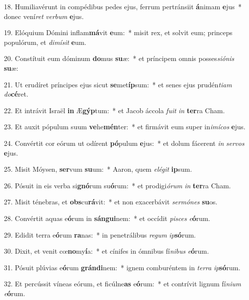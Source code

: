 18. Humiliavérunt in compédibus pedes ejus, ferrum pertránsiit \textbf{á}nimam \textbf{e}jus~*  donec vení\textit{ret} \textit{ver}\textit{bum} \textbf{e}jus.\

19. Elóquium Dómini inflam\textbf{má}vit \textbf{e}um:~*  misit rex, et solvit eum; princeps populórum, et \textit{di}\textit{mí}\textit{sit} \textbf{e}um.\

20. Constítuit eum dóminum \textbf{do}mus \textbf{su}æ:~*  et príncipem omnis posses\textit{si}\textit{ó}\textit{nis} \textbf{su}æ:\

21. Ut erudíret príncipes ejus sicut \textbf{se}met\textbf{íp}sum:~*  et senes ejus prudén\textit{ti}\textit{am} \textit{do}\textbf{cé}ret.\

22. Et intrávit Israël \textbf{in} Æ\textbf{gýp}tum:~*  et Jacob áccola \textit{fu}\textit{it} \textit{in} \textbf{ter}ra Cham.\

23. Et auxit pópulum suum \textbf{ve}he\textbf{mén}ter:~*  et firmávit eum super in\textit{i}\textit{mí}\textit{cos} \textbf{e}jus.\

24. Convértit cor eórum ut odírent \textbf{pó}pulum \textbf{e}jus:~*  et dolum fácerent \textit{in} \textit{ser}\textit{vos} \textbf{e}jus.\

25. Misit Móysen, \textbf{ser}vum \textbf{su}um:~*  Aaron, quem \textit{e}\textit{lé}\textit{git} \textbf{ip}sum.\

26. Pósuit in eis verba si\textbf{gnó}rum su\textbf{ó}rum:~*  et prodigi\textit{ó}\textit{rum} \textit{in} \textbf{ter}ra Cham.\

27. Misit ténebras, et \textbf{obs}cu\textbf{rá}vit:~*  et non exacerbávit \textit{ser}\textit{mó}\textit{nes} \textbf{su}os.\

28. Convértit aquas e\textbf{ó}rum in \textbf{sán}\textbf{gui}nem:~*  et occídit \textit{pi}\textit{sces} \textit{e}\textbf{ó}rum.\

29. Edidit terra e\textbf{ó}rum \textbf{ra}nas:~*  in penetrálibus \textit{re}\textit{gum} \textit{ip}\textbf{só}rum.\

30. Dixit, et venit cœ\textbf{no}my\textbf{í}a:~*  et cínifes in ómnibus fí\textit{ni}\textit{bus} \textit{e}\textbf{ó}rum.\

31. Pósuit plúvias e\textbf{ó}rum \textbf{grán}\textbf{di}nem:~*  ignem comburéntem in \textit{ter}\textit{ra} \textit{ip}\textbf{só}rum.\

32. Et percússit víneas eórum, et ficúlne\textbf{as} e\textbf{ó}rum:~*  et contrívit lignum fí\textit{ni}\textit{um} \textit{e}\textbf{ó}rum.\

